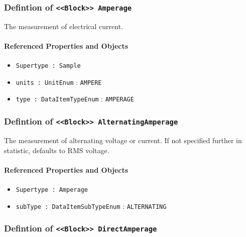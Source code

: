 \subsubsection{Defintion of \texttt{<<Block>> Amperage}}
  \label{type:Amperage}

\FloatBarrier

The measurement of electrical current.

\FloatBarrier
\paragraph{Referenced Properties and Objects}

\begin{itemize}
\item \texttt{Supertype : Sample}

\item \texttt{units : UnitEnum} : \texttt{AMPERE}

\item \texttt{type : DataItemTypeEnum} : \texttt{AMPERAGE}

\end{itemize}
\FloatBarrier
\subsubsection{Defintion of \texttt{<<Block>> AlternatingAmperage}}
  \label{type:AlternatingAmperage}

\FloatBarrier

The measurement of alternating voltage or current.   If not specified further in statistic, defaults to RMS voltage. 

\FloatBarrier
\paragraph{Referenced Properties and Objects}

\begin{itemize}
\item \texttt{Supertype : Amperage}

\item \texttt{subType : DataItemSubTypeEnum} : \texttt{ALTERNATING}

\end{itemize}
\FloatBarrier
\subsubsection{Defintion of \texttt{<<Block>> DirectAmperage}}
  \label{type:DirectAmperage}

